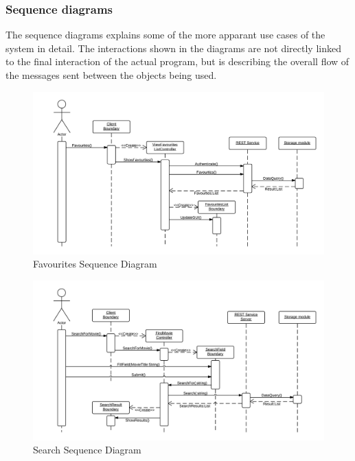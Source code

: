 \subsubsection{Sequence diagrams}

The sequence diagrams explains some of the more apparant use cases of the system in detail. The interactions shown in the diagrams are not directly linked to the final interaction of the actual program, but is describing the overall flow of the messages sent between the objects being used.

\begin{figure}[H]
\includegraphics[width=\linewidth]{img/FavouritesSequenceDiagram.png}
\caption{Favourites Sequence Diagram}
\label{fig:Favourites Sequence Diagram}
\end{figure}


\begin{figure}[H]
\includegraphics[width=\linewidth]{img/SearchSequenceDiagram.png}
\caption{Search Sequence Diagram}
\label{fig:Search Sequence Diagram}
\end{figure}

